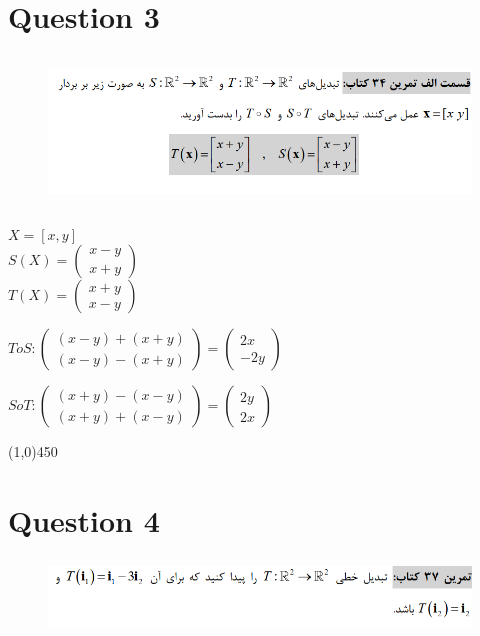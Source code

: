 \documentclass[a4paper,12pt]{article}
\begin{document}
\section {Question 3 }
\begin{figure}[h!]
	\centering
	\includegraphics*[height=4cm]{Q3}
\end{figure}

\begin{doublespace}
$X = [  x , y ]$\\
$S(X) = \begin{pmatrix} x-y\\x+y \end{pmatrix}$\\
$T(X) = \begin{pmatrix} x+y\\x-y \end{pmatrix}$\\
\end{doublespace} 

\begin{doublespace}
$ToS : \begin{pmatrix} (x-y)+(x+y)\\ (x-y)-(x+y) \end{pmatrix} = \begin{pmatrix} 2x\\ -2y \end{pmatrix}$
\end{doublespace} 

\begin{doublespace}
$SoT : \begin{pmatrix} (x+y)-(x-y)\\ (x+y)+(x-y) \end{pmatrix} = \begin{pmatrix} 2y\\ 2x \end{pmatrix}$
\end{doublespace} 

\line(1,0){450}
\newpage
\section {Question 4 }
\begin{figure}[h!]
	\centering
	\includegraphics*[height=2cm]{Q4}
\end{figure}
\end{document}
